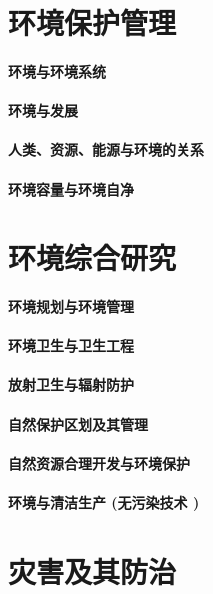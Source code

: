 \documentclass[UTF8]{../ApplicationUniverse}
\begin{document}
\chapter{环境保护管理}
\subsubsection{环境与环境系统}
\subsubsection{环境与发展}
\subsubsection{人类、资源、能源与环境的关系}
\subsubsection{环境容量与环境自净}




\chapter{环境综合研究}
\subsubsection{环境规划与环境管理}
\subsubsection{环境卫生与卫生工程}
\subsubsection{放射卫生与辐射防护}
\subsubsection{自然保护区划及其管理}
\subsubsection{自然资源合理开发与环境保护}
\subsubsection{环境与清洁生产 (无污染技术 )}



\chapter{灾害及其防治}
\end{document}

